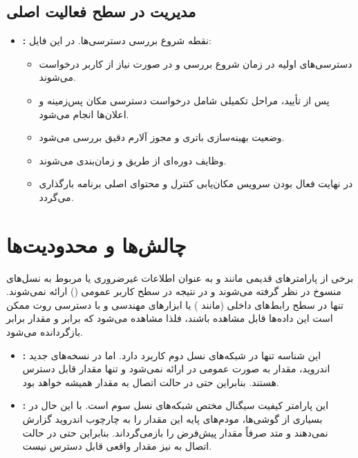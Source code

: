 \subsection{مدیریت در سطح فعالیت اصلی}
\begin{itemize}
    \item \textbf{:}  
    نقطه شروع بررسی دسترسی‌ها. در این فایل:
    \begin{itemize}
        \item دسترسی‌های اولیه در زمان شروع بررسی و در صورت نیاز از کاربر درخواست می‌شوند.
        \item پس از تأیید، مراحل تکمیلی شامل درخواست دسترسی مکان پس‌زمینه و اعلان‌ها انجام می‌شود.
        \item وضعیت بهینه‌سازی باتری و مجوز آلارم دقیق بررسی می‌شود.
        \item وظایف دوره‌ای از طریق  و  زمان‌بندی می‌شوند.
        \item در نهایت فعال بودن سرویس مکان‌یابی کنترل و محتوای اصلی برنامه بارگذاری می‌گردد.
    \end{itemize}
\end{itemize}

\section{چالش‌ها و محدودیت‌ها}
برخی از پارامترهای قدیمی مانند  و  به عنوان اطلاعات غیرضروری یا مربوط به نسل‌های منسوخ در نظر گرفته می‌شوند و در نتیجه در سطح کاربر عمومی () ارائه نمی‌شوند. تنها در سطح رابط‌های داخلی (مانند ) یا ابزارهای مهندسی و با دسترسی روت ممکن است این داده‌ها قابل مشاهده باشند، فلذا مشاهده می‌شود که  برابر  و مقدار  برابر  بازگردانده می‌شود.

\begin{itemize}
    \item \textbf{:} این شناسه تنها در شبکه‌های نسل دوم کاربرد دارد. اما در نسخه‌های جدید اندروید، مقدار  به صورت عمومی در  ارائه نمی‌شود و تنها مقدار  قابل دسترس هستند. بنابراین حتی در حالت اتصال به  مقدار  همیشه  خواهد بود.

    \item \textbf{:} این پارامتر کیفیت سیگنال مختص شبکه‌های نسل سوم است. با این حال در بسیاری از گوشی‌ها، مودم‌های پایه  این مقدار را به چارچوب اندروید گزارش نمی‌دهند و متد  صرفاً مقدار پیش‌فرض  را بازمی‌گرداند. بنابراین حتی در حالت اتصال به  نیز مقدار واقعی  قابل دسترس نیست.
\end{itemize}